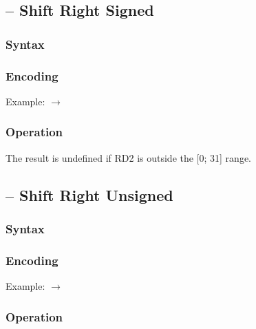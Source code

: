 \documentclass[a4paper,12pt,twoside,extrafontsizes]{memoir}
\begin{document}
{\subsection{ -- Shift Right Signed}
\label{subsec:instr:srs}

\subsubsection{Syntax}


\subsubsection{Encoding}


Example:  $\rightarrow$ 

\subsubsection{Operation}


The result is undefined if RD2 is outside the [0; 31] range.

\subsection{ -- Shift Right Unsigned}
\label{subsec:instr:sru}

\subsubsection{Syntax}


\subsubsection{Encoding}


Example:  $\rightarrow$ 

\subsubsection{Operation}

}
\end{document}
